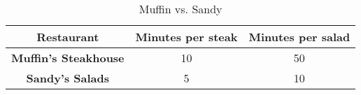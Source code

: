 \begin{table}[h]
  \centering
  \begin{tabular}{|c|c|c|}
    \hline
    \textbf{Restaurant} & \textbf{Minutes per steak} & \textbf{Minutes per salad} \\
    \hline
    \textbf{Muffin's Steakhouse} & 10 & 50 \\
    \hline
    \textbf{Sandy's Salads} & 5 & 10 \\
    \hline
  \end{tabular}
  \caption{Muffin vs. Sandy}
\end{table}
